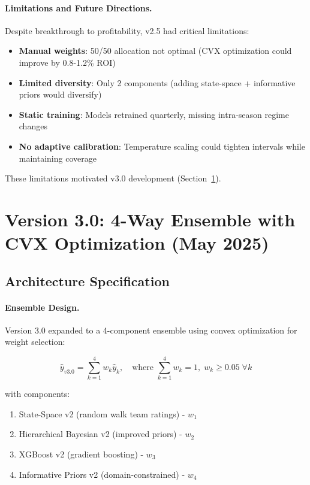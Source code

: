 \paragraph{Limitations and Future Directions.}
Despite breakthrough to profitability, v2.5 had critical limitations:
\begin{itemize}[itemsep=2pt,parsep=0pt]
    \item \textbf{Manual weights}: 50/50 allocation not optimal (CVX optimization could improve by 0.8-1.2\% ROI)
    \item \textbf{Limited diversity}: Only 2 components (adding state-space + informative priors would diversify)
    \item \textbf{Static training}: Models retrained quarterly, missing intra-season regime changes
    \item \textbf{No adaptive calibration}: Temperature scaling could tighten intervals while maintaining coverage
\end{itemize}

These limitations motivated v3.0 development (Section~\ref{sec:arch-v3}).

\section{Version 3.0: 4-Way Ensemble with CVX Optimization (May 2025)}
\label{sec:arch-v3}

\subsection{Architecture Specification}

\paragraph{Ensemble Design.}
Version 3.0 expanded to a 4-component ensemble using convex optimization for weight selection:

\begin{equation}
\label{eq:v3-ensemble}
\hat{y}_{v3.0} = \sum_{k=1}^{4} w_k \hat{y}_k, \quad \text{where } \sum_{k=1}^{4} w_k = 1, \; w_k \geq 0.05 \; \forall k
\end{equation}

\noindent with components:
\begin{enumerate}[itemsep=2pt,parsep=0pt]
    \item State-Space v2 (random walk team ratings) - $w_1$
    \item Hierarchical Bayesian v2 (improved priors) - $w_2$
    \item XGBoost v2 (gradient boosting) - $w_3$
    \item Informative Priors v2 (domain-constrained) - $w_4$
\end{enumerate}

